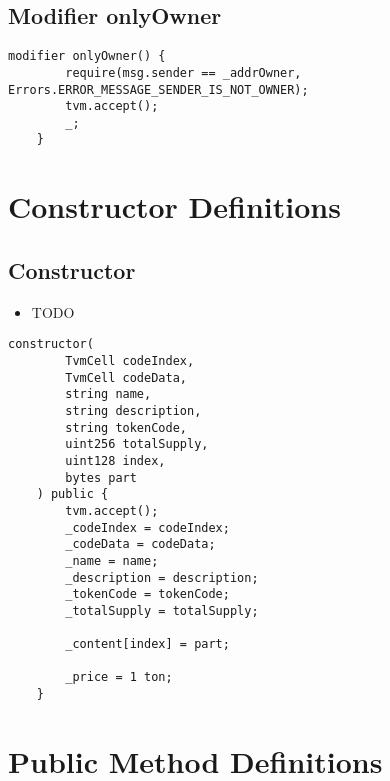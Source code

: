 \subsection{Modifier onlyOwner}


\begin{lstlisting}[firstnumber=34]
    modifier onlyOwner() {
        require(msg.sender == _addrOwner, Errors.ERROR_MESSAGE_SENDER_IS_NOT_OWNER);
        tvm.accept();
        _;
    }
\end{lstlisting}

\section{Constructor Definitions}


\subsection{Constructor}

\begin{itemize}
\item TODO
\end{itemize}

\begin{lstlisting}[firstnumber=40]
    constructor(
        TvmCell codeIndex,
        TvmCell codeData,
        string name,
        string description,
        string tokenCode,
        uint256 totalSupply,
        uint128 index,
        bytes part
    ) public {
        tvm.accept();
        _codeIndex = codeIndex;
        _codeData = codeData;
        _name = name;
        _description = description;
        _tokenCode = tokenCode;
        _totalSupply = totalSupply;

        _content[index] = part;
        
        _price = 1 ton;
    }
\end{lstlisting}

\section{Public Method Definitions}


